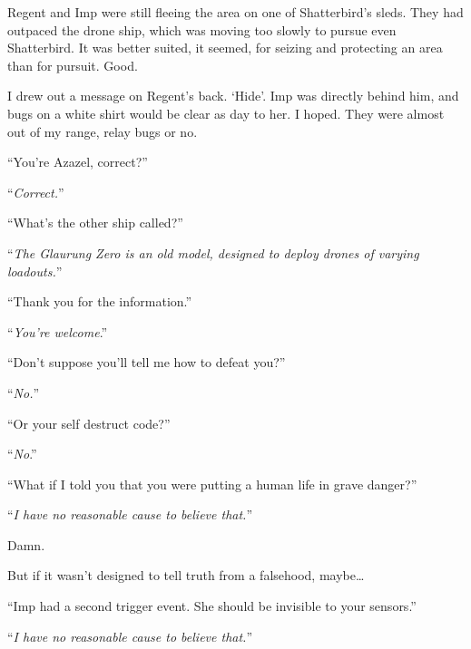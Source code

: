 Regent and Imp were still fleeing the area on one of Shatterbird's sleds.  They had outpaced the drone ship, which was moving too slowly to pursue even Shatterbird.  It was better suited, it seemed, for seizing and protecting an area than for pursuit.  Good.



I drew out a message on Regent's back.  `Hide'.  Imp was directly behind him, and bugs on a white shirt would be clear as day to her.  I hoped.  They were almost out of my range, relay bugs or no.



``You're Azazel, correct?''



``\emph{Correct.}''



``What's the other ship called?''



``\emph{The Glaurung Zero is an old model, designed to deploy drones of varying loadouts.}''



``Thank you for the information.''



``\emph{You're welcome}.''



``Don't suppose you'll tell me how to defeat you?''



``\emph{No.}''



``Or your self destruct code?''



``\emph{No}.''



``What if I told you that you were putting a human life in grave danger?''



``\emph{I have no reasonable cause to believe that.}''



Damn.



But if it wasn't designed to tell truth from a falsehood, maybe\ldots



``Imp had a second trigger event.  She should be invisible to your sensors.''



``\emph{I have no reasonable cause to believe that.}''



